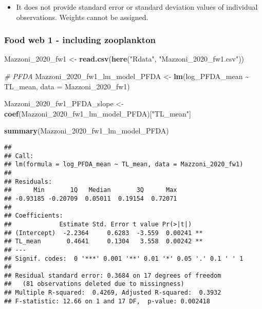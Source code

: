 \documentclass[
]{article}
\newenvironment{Shaded}{\begin{snugshade}}{\end{snugshade}}
\newcommand{\AttributeTok}[1]{\textcolor[rgb]{0.13,0.29,0.53}{#1}}
\newcommand{\CommentTok}[1]{\textcolor[rgb]{0.56,0.35,0.01}{\textit{#1}}}
\newcommand{\FunctionTok}[1]{\textcolor[rgb]{0.13,0.29,0.53}{\textbf{#1}}}
\newcommand{\NormalTok}[1]{#1}
\newcommand{\OtherTok}[1]{\textcolor[rgb]{0.56,0.35,0.01}{#1}}
\newcommand{\SpecialCharTok}[1]{\textcolor[rgb]{0.81,0.36,0.00}{\textbf{#1}}}
\newcommand{\StringTok}[1]{\textcolor[rgb]{0.31,0.60,0.02}{#1}}
\providecommand{\tightlist}{%
  \setlength{\itemsep}{0pt}\setlength{\parskip}{0pt}}
\begin{document}
\begin{itemize}
\tightlist
\item
  It does not provide standard error or standard deviation values of
  individual observations. Weights cannot be assigned.
\end{itemize}

\subsubsection{Food web 1 - including
zooplankton}\label{food-web-1---including-zooplankton}

\begin{Shaded}
\begin{Highlighting}[]
\NormalTok{Mazzoni\_2020\_fw1 }\OtherTok{\textless{}{-}} \FunctionTok{read.csv}\NormalTok{(}\FunctionTok{here}\NormalTok{(}\StringTok{"Rdata"}\NormalTok{, }\StringTok{"Mazzoni\_2020\_fw1.csv"}\NormalTok{))}

\CommentTok{\# PFDA}
\NormalTok{Mazzoni\_2020\_fw1\_lm\_model\_PFDA }\OtherTok{\textless{}{-}} \FunctionTok{lm}\NormalTok{(log\_PFDA\_mean }\SpecialCharTok{\textasciitilde{}}\NormalTok{ TL\_mean,}
                                      \AttributeTok{data =}\NormalTok{ Mazzoni\_2020\_fw1)}

\NormalTok{Mazzoni\_2020\_fw1\_PFDA\_slope }\OtherTok{\textless{}{-}} \FunctionTok{coef}\NormalTok{(Mazzoni\_2020\_fw1\_lm\_model\_PFDA)[}\StringTok{"TL\_mean"}\NormalTok{]}

\FunctionTok{summary}\NormalTok{(Mazzoni\_2020\_fw1\_lm\_model\_PFDA)}
\end{Highlighting}
\end{Shaded}

\begin{verbatim}
## 
## Call:
## lm(formula = log_PFDA_mean ~ TL_mean, data = Mazzoni_2020_fw1)
## 
## Residuals:
##      Min       1Q   Median       3Q      Max 
## -0.93185 -0.20709  0.05011  0.19154  0.72071 
## 
## Coefficients:
##             Estimate Std. Error t value Pr(>|t|)   
## (Intercept)  -2.2364     0.6283  -3.559  0.00241 **
## TL_mean       0.4641     0.1304   3.558  0.00242 **
## ---
## Signif. codes:  0 '***' 0.001 '**' 0.01 '*' 0.05 '.' 0.1 ' ' 1
## 
## Residual standard error: 0.3684 on 17 degrees of freedom
##   (81 observations deleted due to missingness)
## Multiple R-squared:  0.4269, Adjusted R-squared:  0.3932 
## F-statistic: 12.66 on 1 and 17 DF,  p-value: 0.002418
\end{verbatim}
\end{document}
